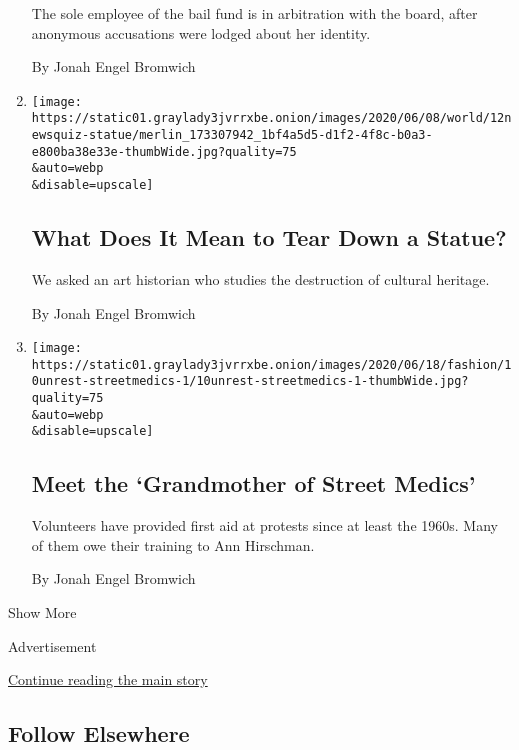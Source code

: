 \begin{enumerate}
  The sole employee of the bail fund is in arbitration with the board,
  after anonymous accusations were lodged about her identity.

  By Jonah Engel Bromwich
\item
  \href{/2020/06/11/style/confederate-statue-columbus-analysis.html}{}

  \texttt{[image: https://static01.graylady3jvrrxbe.onion/images/2020/06/08/world/12newsquiz-statue/merlin\_173307942\_1bf4a5d5-d1f2-4f8c-b0a3-e800ba38e33e-thumbWide.jpg?quality=75\\\&auto=webp\\\&disable=upscale]}

  \hypertarget{what-does-it-mean-to-tear-down-a-statue}{%
  \subsection{What Does It Mean to Tear Down a
  Statue?}\label{what-does-it-mean-to-tear-down-a-statue}}

  We asked an art historian who studies the destruction of cultural
  heritage.

  By Jonah Engel Bromwich
\item
  \href{/2020/06/10/style/protest-street-medics.html}{}

  \texttt{[image: https://static01.graylady3jvrrxbe.onion/images/2020/06/18/fashion/10unrest-streetmedics-1/10unrest-streetmedics-1-thumbWide.jpg?quality=75\\\&auto=webp\\\&disable=upscale]}

  \hypertarget{meet-the-grandmother-of-street-medics}{%
  \subsection{Meet the `Grandmother of Street
  Medics'}\label{meet-the-grandmother-of-street-medics}}

  Volunteers have provided first aid at protests since at least the
  1960s. Many of them owe their training to Ann Hirschman.

  By Jonah Engel Bromwich
\end{enumerate}

Show More

Advertisement

\protect\hyperlink{after-mid2}{Continue reading the main story}

\hypertarget{follow-elsewhere}{%
\subsection{Follow Elsewhere}\label{follow-elsewhere}}

